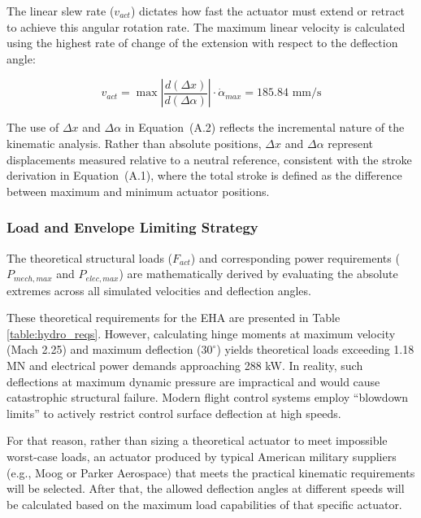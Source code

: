 \documentclass[
bindingoffset=5mm,  %
footnoteindent=3mm, %
hyphenation=true    %
]{src/wut-thesis}
\begin{document}
	The linear slew rate ($v_{act}$) dictates how fast the actuator must extend or retract to achieve this angular rotation rate. The maximum linear velocity is calculated using the highest rate of change of the extension with respect to the deflection angle:
	
	\begin{equation}
		v_{act} = \max \left| \frac{d(\Delta x)}{d(\Delta \alpha)} \right| \cdot \dot{\alpha}_{max} = 185.84 \text{ mm/s}
	\end{equation}
	
	The use of $\Delta x$ and $\Delta\alpha$ in Equation~(A.2) reflects the incremental nature of the kinematic analysis. Rather than absolute positions, $\Delta x$ and $\Delta\alpha$ represent displacements measured relative to a neutral reference, consistent with the stroke derivation in Equation~(A.1), where the total stroke is defined as the difference between maximum and minimum actuator positions.
	
	\subsubsection{Load and Envelope Limiting Strategy}
	The theoretical structural loads ($F_{act}$) and corresponding power requirements ($P_{mech, max}$ and $P_{elec, max}$) are mathematically derived by evaluating the absolute extremes across all simulated velocities and deflection angles. 
	
	These theoretical requirements for the EHA are presented in Table \ref{table:hydro_reqs}. However, calculating hinge moments at maximum velocity (Mach 2.25) and maximum deflection ($30^\circ$) yields theoretical loads exceeding 1.18 MN and electrical power demands approaching 288 kW. In reality, such deflections at maximum dynamic pressure are impractical and would cause catastrophic structural failure. Modern flight control systems employ \enquote{blowdown limits} to actively restrict control surface deflection at high speeds.
	
	For that reason, rather than sizing a theoretical actuator to meet impossible worst-case loads, an actuator produced by typical American military suppliers (e.g., Moog or Parker Aerospace) that meets the practical kinematic requirements will be selected. After that, the allowed deflection angles at different speeds will be calculated based on the maximum load capabilities of that specific actuator.
	
\end{document}
